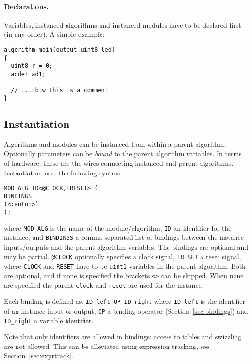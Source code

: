 \documentclass[a4]{article}
\begin{document}

\paragraph{Declarations.} Variables, instanced algorithms and instanced modules have to be declared first (in any order). A simple example:

\begin{verbatim}
algorithm main(output uint8 led)
{
  uint8 r = 0;
  adder ad1;
  
  // ... btw this is a comment
}
\end{verbatim}


\subsection{Instantiation}
\label{sec:instantiation}

Algorithms and modules can be instanced from within a parent algorithm. Optionally parameters can be \textit{bound} to the parent algorithm variables. 
In terms of hardware, these are the wires connecting instanced and parent algorithms.
%
Instantiation uses the following syntax:
%
\begin{verbatim}
MOD_ALG ID<@CLOCK,!RESET> (
BINDINGS
(<:auto:>)
);
\end{verbatim}
%
where \texttt{MOD\_ALG} is the name of the module/algorithm, \texttt{ID} an
identifier for the instance, and \texttt{BINDINGS} a comma separated list of 
bindings between the instance inputs/outputs and the parent algorithm variables.
The bindings are optional and may be partial.
\texttt{@CLOCK} optionally specifies a clock signal, \texttt{!RESET} a reset signal, where \texttt{CLOCK} and \texttt{RESET} have to be \texttt{uint1} variables in the parent algorithm. Both are optional, and if none is specified the brackets \texttt{<>} can be skipped. When none are specified the parent \texttt{clock} and \texttt{reset} are used for the instance.

Each binding is defined as:
\texttt{ID\_left OP ID\_right} 
where \texttt{ID\_left}
is the identifier of an instance input or output, \texttt{OP} a binding
operator (Section~\ref{sec:bindings}) and \texttt{ID\_right} a variable identifier.

Note that only identifiers are allowed in bindings: access to tables and swizzling are not allowed. This can be alleviated using expression tracking, see Section~\ref{sec:exprtrack}.
\end{document}
